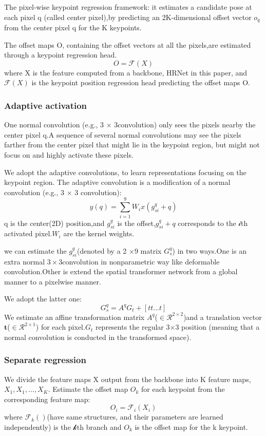 \documentclass[11pt]{article}
\begin{document}
The pixel-wise keypoint regression framework: it estimates a candidate pose at each pixel q (called center pixel),by predicting an 2K-dimensional offset vector $o_q$ from the center pixel q for the K keypoints.

The offset maps O, containing the offset vectors at all the pixels,are estimated through a keypoint regression head.
$$O=\mathcal{F}(X)$$
where X is the feature computed from a backbone, HRNet in this paper, and $\mathcal{F}(X)$ is the keypoint position regression head predicting the offset maps O.
\subsubsection{Adaptive activation}
One normal convolution (e.g., 3 × 3convolution) only sees the pixels nearby the center pixel q.A sequence of several normal convolutions may see the pixels farther from the center pixel that might lie in the keypoint region, but might not focus on and highly activate these pixels.

We adopt the adaptive convolutions, to learn representations focusing on the keypoint region. The adaptive convolution is a modification of a normal convolution (e.g., 3 × 3 convolution):
$$y(q)=\sum_{i=1}^{9}W_ix(g^q_{si}+q)$$
q is the center(2D) position,and $g^q_{si}$ is the offset,$g^q_{si} + q$ corresponds to the $\mathcal{i}$th activated pixel.$W_i$ are the kernel weights.

we can estimate the $g^q_{si}$(denoted by a 2 $\times $9 matrix $G_s^q$) in two ways.One is an extra normal $3\times 3$convolution in nonparametric way like deformable convolution.Other is extend the spatial transformer network from a global manner to a pixelwise manner.

We adopt the latter one:
$$G_s^q = A^qG_t +[t t ... t]$$
We estimate an affine transformation matrix $A^q$($\in \mathcal{R}^{2\times 2}$)and a translation vector $\textbf{t}$($\in \mathcal{R}^{2\times 1}$) for each pixel.$G_t$ represents the regular 3$\times$3 position (meaning that a normal convolution is conducted in the transformed space).

\subsubsection{Separate regression}
We divide the feature maps X output from the backbone into K feature maps, $X_1,X_1,...,X_K$. Estimate the offset map $O_k$ for each keypoint from the corresponding feature map:
$$O_i = \mathcal{F}_i(X_i)$$
where $\mathcal{F}_k()$(have same structures, and their parameters are learned independently) is the $\mathcal{k}$th branch and $O_k$ is the offset map for the k keypoint.
\end{document}

